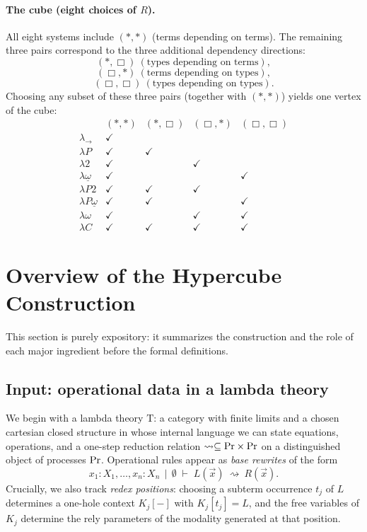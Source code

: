 \documentclass[11pt]{article}
\theoremstyle{definition}
\theoremstyle{plain}
\theoremstyle{remark}
\theoremstyle{plain}
\newcommand{\Boxsort}{\Box}
\newcommand{\astsort}{\ast}
\renewcommand{\Pr}{{\rm Pr}}
\newcommand{\rsq}{\rightsquigarrow}
\newcommand{\ctx}{\,|\,}
\newcommand{\mrm}[1]{\mathrm{#1}}
\newcommand{\T}{\mrm{T}}
\begin{document}
\paragraph{The cube (eight choices of $R$).}
All eight systems include $(\astsort,\astsort)$ (terms depending on terms).  The remaining three
pairs correspond to the three additional dependency directions:
\[(\astsort,\Boxsort)\ (\text{types depending on terms}),\]
\[(\Boxsort,\astsort)\ (\text{terms depending on types}),\]
\[(\Boxsort,\Boxsort)\ (\text{types depending on types}).\]
Choosing any subset of these three pairs (together with $(\astsort,\astsort)$) yields one vertex
of the cube:
\[
\begin{array}{l|cccc}
 & (\astsort,\astsort) & (\astsort,\Boxsort) & (\Boxsort,\astsort) & (\Boxsort,\Boxsort) \\
\hline
\lambda_{\to}                & \checkmark &           &           &           \\
\lambda P                    & \checkmark & \checkmark &          &           \\
\lambda 2                    & \checkmark &           & \checkmark &          \\
\lambda \underline{\omega}   & \checkmark &           &           & \checkmark \\
\lambda P2                   & \checkmark & \checkmark & \checkmark &          \\
\lambda P\underline{\omega}  & \checkmark & \checkmark &          & \checkmark \\
\lambda \omega               & \checkmark &           & \checkmark & \checkmark \\
\lambda C                    & \checkmark & \checkmark & \checkmark & \checkmark
\end{array}
\]
\vspace{1em}

\section{Overview of the Hypercube Construction}
\label{sec:overview}

This section is purely expository: it summarizes the construction and the role of each major ingredient before the formal definitions.

\subsection{Input: operational data in a lambda theory}
We begin with a lambda theory $\T$: a category with finite limits and a chosen cartesian closed structure in whose internal language we can state equations, operations, and a one-step reduction relation $\rsq\subseteq \Pr\times\Pr$ on a distinguished object of processes $\Pr$.
Operational rules appear as \emph{base rewrites} of the form
\[
  x_1:X_1,\dots,x_n:X_n \;\ctx\; \emptyset \;\vdash\; L(\vec x)\ \rsq\ R(\vec x).
\]
Crucially, we also track \emph{redex positions}: choosing a subterm occurrence $t_j$ of $L$ determines a one-hole context $K_j[-]$ with $K_j[t_j]=L$, and the free variables of $K_j$ determine the rely parameters of the modality generated at that position.
\end{document}
